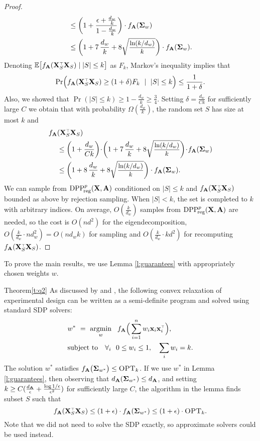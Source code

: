 \documentclass[11pt]{article}
\begin{document}
\begin{proof}
\begin{align*}
  &\leq
  \bigg(1+\frac{\epsilon+\frac{d_w}k}{1-\frac{d_w}k}\bigg)\cdot
f_{\A}(\Sigmab_w)
\\ &\leq \bigg(1+7\,\frac{d_w}{k} +
  8\sqrtshort{\frac{\ln(k/d_w)}{k}}\bigg)\cdot f_{\A}(\Sigmab_w).
\end{align*}
Denoting $\E\big[f_{\A}(\X_S^\top\X_S)\mid |S|\leq k\big]$ as $F_k$,
Markov's inequality implies that
\[\Pr\Big(f_{\A}(\X_S^\top\X_S) \geq
  (1+\delta) F_k\ \mid\ |S|\leq k\Big)\leq \frac1{1+\delta}.\]
Also, we showed
that $\Pr(|S|\leq k)\geq 1-\frac{d_w}{k}\geq \frac34$. Setting $\delta=\frac{d_w}{C
  k}$ for sufficiently large $C$ we obtain that with probability
$\Omega(\frac{d_w}{k})$, the random set $S$ has size at most $k$ and
\begin{align*}
f_{\A}&(\X_S^\top\X_S) \\
&\leq \bigg(1+\frac{d_w}{C k}\bigg)\!\cdot\! \bigg(1+7\,\frac{d_w}{k} +
  8\sqrtshort{\frac{\ln(k/d_w)}{k}}\bigg)\!\cdot\! f_{\A}(\Sigmab_w)\\
&\leq
\bigg(1+8\,\frac{d_w}{k} +
  8\sqrtshort{\frac{\ln(k/d_w)}{k}}\bigg)\cdot f_{\A}(\Sigmab_w).
\end{align*}
We can sample from ${{\mathrm{DPP}}_{\!\mathrm{reg}}^{p}}(\mathbf X,\mathbf A)$ conditioned on
$|S|\leq k$ and $f_{\A}(\X_S^\top\X_S)$ bounded as above by rejection
sampling. When $|S|<k$,  the set is completed to
$k$ with arbitrary indices. On average, $O(\frac k{d_w})$ samples from
${{\mathrm{DPP}}_{\!\mathrm{reg}}^{p}}(\mathbf X,\mathbf A)$ are needed, so the cost is $O(nd^2)$ for the
eigendecomposition, $O(\frac{k}{d_w}\cdot nd_w^2)=O(nd_wk)$ for
sampling and $O(\frac k{d_w}\cdot kd^2)$ for recomputing $f_{\A}(\X_S^\top\X_S)$.
\end{proof}
To prove the main results, we use Lemma \ref{l:guarantees} with
appropriately chosen weights $w$.
\begin{proofof}{Theorem}{\ref{t:q2}}
  As discussed by \cite{near-optimal-design} and
  \cite{boyd2004convex}, the following convex 
relaxation of experimental design can be written as a semi-definite
program and solved using standard SDP solvers:
\begin{align}
  &w^* \ = \  \argmin_w\ \
  f_{\A}\Big(\sum_{i=1}^nw_i\x_i\x_i^\top\Big),\quad\\
  &\text{subject to}\quad
  \forall_i\ \ 0\leq w_i\leq 1,\quad \sum_i w_i=k.\label{eq:sdp}
\end{align}
The solution $w^*$ satisfies $f_{\mathbf A}\big(\mathbf{\Sigma}_{w^*}\big)\leq
{\textsc{OPT}_k}$. If we use $w^*$ in Lemma \ref{l:guarantees}, then observing
that $d_{\mathbf A}(\mathbf{\Sigma}_{w^*})\leq d_{\mathbf A}$, and setting $k\geq C(\frac
{d_{\mathbf A}}{\epsilon} + \frac{\log1/\epsilon}{\epsilon^2})$ for
sufficiently large $C$, the algorithm in the lemma finds subset $S$
such that
\[f_{\A}(\X_S^\top\X_S)\leq (1+\epsilon)\cdot
f_{\A}(\Sigmab_{w^*})\leq
(1+\epsilon)\cdot\opt.\]
Note that we did not need to
solve the SDP exactly, so approximate solvers could be used instead.
\end{proofof}
\end{document}

